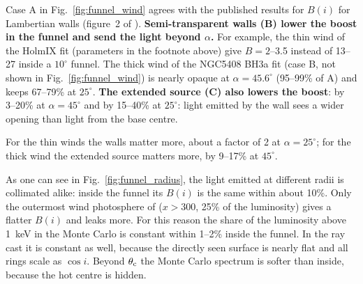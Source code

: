 Case A in Fig.~\ref{fig:funnel_wind}  agrees with the published results for  $B(i)$ for Lambertian walls (figure~2 of \citealt{Ahlberg2026}). %
\textbf{Semi-transparent walls (B) lower the boost in the funnel and send the light beyond $\alpha$.}
For example, the thin wind of the HolmIX fit (parameters in the footnote above)
give $B = 2$--3.5 instead of 13--27
inside a $10^\circ$ funnel.
The thick wind of the NGC5408 BH3a fit (case B, not shown in Fig.~\ref{fig:funnel_wind}) is nearly opaque at $\alpha = 45.6^\circ$ (95--99\% of A) and keeps 67--79\% at $25^\circ$.
\textbf{The extended source (C) also lowers the boost}: by 3--20\% at $\alpha = 45^\circ$ and by 15--40\% at $25^\circ$: light emitted by the wall sees a wider opening than light from the base centre.

For the thin winds the walls matter more, about a factor of 2 at $\alpha = 25^\circ$; for the thick wind the extended source matters more, by 9--17\% at $45^\circ$.

As one can see in Fig.~\ref{fig:funnel_radius}, 
the light emitted at different radii is collimated alike: inside the funnel its $B(i)$ is the same within about 10\%.
Only the outermost wind photosphere of \srcNGCfiftyfour ($x > 300$, 25\% of the luminosity) gives a flatter $B(i)$ and leaks more.
For this reason the share of the luminosity above 1~keV in the Monte Carlo is constant within 1--2\% inside the funnel.
In the ray cast it is constant as well, because the directly seen surface is nearly flat and all rings scale as $\cos i$.
Beyond $\theta_{\rm c}$ the Monte Carlo spectrum is softer than inside, because the hot centre is hidden.

